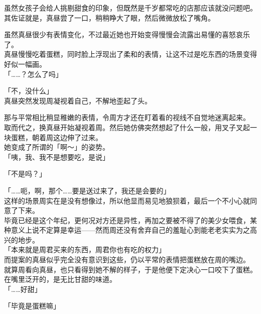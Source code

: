 虽然女孩子会给人挑剔甜食的印象，但既然是千岁都常吃的店那应该就没问题吧。\\

其佐证就是，真昼尝了一口，稍稍睁大了眼，然后微微放松了嘴角。

虽然真昼很少有表情变化，不过最近她也开始变得慢慢会流露出易懂的喜怒哀乐了。\\

真昼慢慢吃着蛋糕，同时脸上浮现出了柔和的表情，让这不过是吃东西的场景变得好似一幅画。\\

「……？怎么了吗」

「不，没什么」\\

真昼突然发现周凝视着自己，不解地歪起了头。

那与平常相比稍显稚嫩的表情，令周方才还在盯着看的视线不自觉地迷离起来。\\

取而代之，换真昼开始凝视着周。然后她仿佛突然想起了什么一般，用叉子叉起一块蛋糕，朝着周这边伸了过来。\\

她变成了所谓的「啊～」的姿势。\\

「咦，我、我不是想要吃，是说」

「不是吗？」

「……呃，啊，那个……要是送过来了，我还是会要的」\\

这样的场景周实在是没有想像过，所以他显而易见地狼狈着，最后一个不小心就同意了下来。\\

毕竟已经是这个年纪，更何况对方还是异性，再加之要被不得了的美少女喂食，某种意义上说不定算是幸运——然而周还没有舍弃自己的羞耻心到能老老实实为之高兴的地步。\\

「本来就是周君买来的东西，周君你也有吃的权力」\\

而提案的真昼似乎完全没有意识到这些，仍以平常的表情把蛋糕放在周的嘴边。\\

就算周看向真昼，也只看得到她不解的样子，于是他便下定决心一口咬下了蛋糕。\\

在嘴里泛开的，是无比甘甜的味道。\\

「……好甜」

「毕竟是蛋糕嘛」\\

